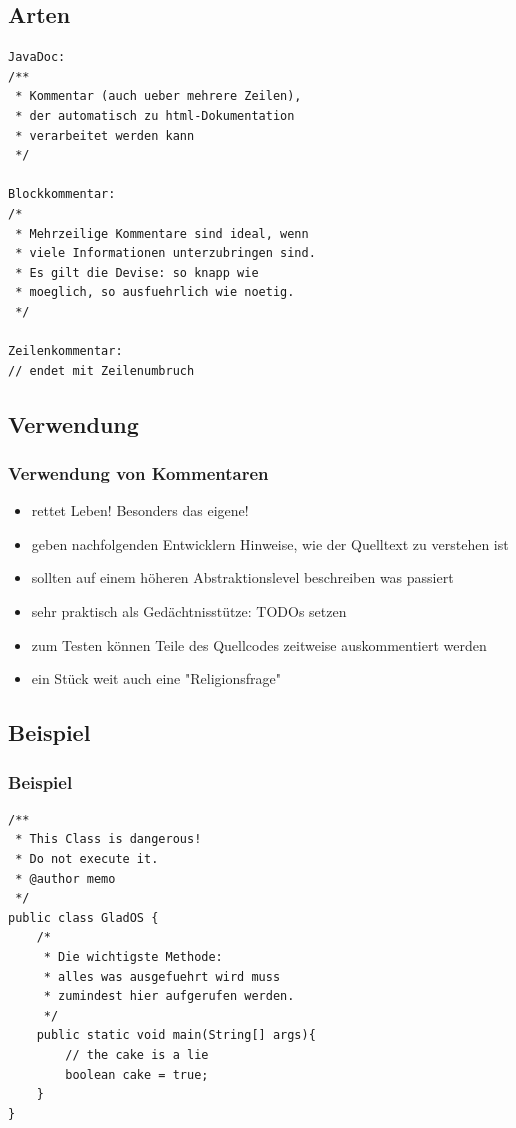 \documentclass[final]{beamer}
\begin{document}
\subsection{Arten}
\begin{frame}[containsverbatim]
	\begin{lstlisting}
JavaDoc:
/**
 * Kommentar (auch ueber mehrere Zeilen),
 * der automatisch zu html-Dokumentation
 * verarbeitet werden kann
 */

Blockkommentar:
/*
 * Mehrzeilige Kommentare sind ideal, wenn
 * viele Informationen unterzubringen sind.
 * Es gilt die Devise: so knapp wie
 * moeglich, so ausfuehrlich wie noetig.
 */

Zeilenkommentar:
// endet mit Zeilenumbruch
	\end{lstlisting}
\end{frame}

\subsection{Verwendung}
\begin{frame}
	\frametitle{Verwendung von Kommentaren}
	\begin{itemize}
		\item{rettet Leben! Besonders das eigene!}
		\item{geben nachfolgenden Entwicklern Hinweise, wie der Quelltext zu verstehen ist}
		\item{sollten auf einem höheren Abstraktionslevel beschreiben was passiert}
		\item{sehr praktisch als Gedächtnisstütze: TODOs setzen}
		\item{zum Testen können Teile des Quellcodes zeitweise auskommentiert werden}
		\pause
		\item{ein Stück weit auch eine "Religionsfrage"}
	\end{itemize}
\end{frame}

\subsection{Beispiel}
\begin{frame}[containsverbatim]
\frametitle{Beispiel}
	\begin{lstlisting}
/**
 * This Class is dangerous!
 * Do not execute it.
 * @author memo
 */
public class GladOS {
	/*
	 * Die wichtigste Methode:
	 * alles was ausgefuehrt wird muss
	 * zumindest hier aufgerufen werden.
	 */
	public static void main(String[] args){
		// the cake is a lie
		boolean cake = true;
	}
}
	\end{lstlisting}
%
\end{frame}
\end{document}
